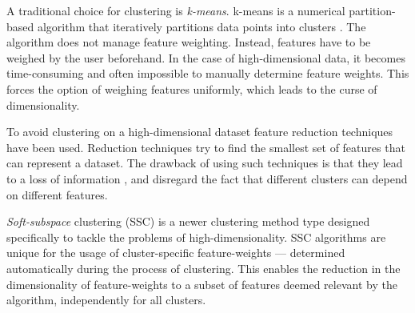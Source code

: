 \documentclass[../report.tex]{subfiles}
\begin{document}
A traditional choice for clustering is \textit{k-means}. k-means is a numerical partition-based algorithm that iteratively partitions data points into clusters \cite{huang2005automated}. The algorithm does not manage feature weighting. Instead, features have to be weighed by the user beforehand. In the case of high-dimensional data, it becomes time-consuming and often impossible to manually determine feature weights. This forces the option of weighing features uniformly, which leads to the curse of dimensionality.

To avoid clustering on a high-dimensional dataset feature reduction techniques have been used. Reduction techniques try to find  the smallest set of features that can represent a dataset. The drawback of using such techniques is that they lead to a loss of information \cite{Gan2016}, and disregard the fact that different clusters can depend on different features.


\textit{Soft-subspace} clustering (SSC) \cite{Gan2006, Jing2007, Gan2016} is a newer clustering method type designed specifically to tackle the problems of high-dimensionality. SSC algorithms are unique for the usage of cluster-specific feature-weights --- determined automatically during the process of clustering. This enables the reduction in the dimensionality of feature-weights to a subset of features deemed relevant by the algorithm, independently for all clusters.

\end{document}
